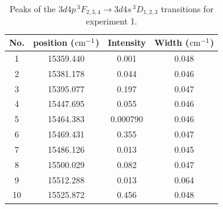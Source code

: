 \documentclass[a4paper]{article}
\begin{document}
\begin{table}[htb!]

\centering

\begin{tabular}{c|c|c|c}

\hline

No. & position ($\rm cm^{-1}$) & Intensity & Width ($\rm cm^{-1}$) \\

\hline

1 & 15359.440 & 0.001 & 0.048 \\

2 & 15381.178 & 0.044 & 0.046 \\

3 & 15395.077 & 0.197 & 0.047 \\

4 & 15447.695 & 0.055 & 0.046 \\

5 & 15464.383 & 0.000790 & 0.046 \\

6 & 15469.431 & 0.355 & 0.047 \\

7 & 15486.126 & 0.013 & 0.045 \\

8 & 15500.029 & 0.082 & 0.047 \\

9 & 15512.288 & 0.013 & 0.064 \\

10 & 15525.872 & 0.456 & 0.048 \\

\hline

\end{tabular}

\caption{Peaks of the $3d4p\,^3F_{2,3,4} \to 3d4s\,^3D_{1,2,3}$ transitions for experiment 1.}

\label{tab:transitions21}

\end{table}
\end{document}
